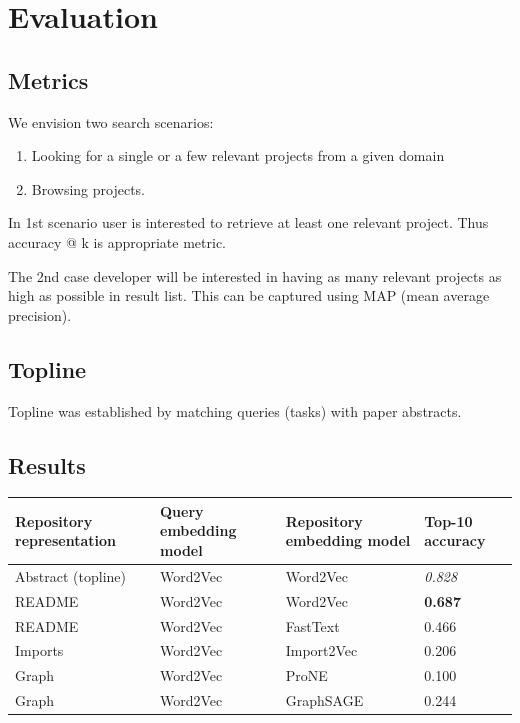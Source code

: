 \documentclass[11pt]{report}
\begin{document}
\chapter{Evaluation}
\section{Metrics}

We envision two search scenarios:

\begin{enumerate}
    \item Looking for a single or a few relevant projects from a given domain
    \item Browsing projects.
\end{enumerate}

In 1st scenario user is interested to retrieve at least one relevant project. Thus accuracy @ k is appropriate metric.

The 2nd case developer will be interested in having as many relevant projects as high as possible in result list. This can be captured using MAP (mean average precision).


\section{Topline}


Topline was established by matching queries (tasks) with paper abstracts.

\section{Results}
  
 \begin{center}
 \begin{tabular}{ |p{3cm}|p{2cm}|p{2cm}|p{2cm}|}
 \hline
  Repository \newline representation & Query \newline embedding model &  Repository embedding model & Top-10 \newline accuracy \\
 \hline 
  Abstract (topline)                 & Word2Vec              & Word2Vec                   &        \textit{0.828} \\
  README                    & Word2Vec              & Word2Vec                   &            \textbf{0.687} \\
  README                    & Word2Vec              & FastText                   &           0.466 \\
  Imports                   & Word2Vec              & Import2Vec                 &        0.206 \\
  Graph                     & Word2Vec              & ProNE                      &            0.100 \\
  Graph                     & Word2Vec              & GraphSAGE                            & 0.244         \\
 \hline
 \end{tabular}
 \end{center}
\end{document}
